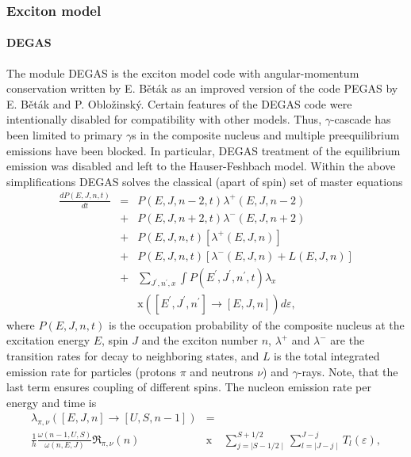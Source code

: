 \documentclass[twocolumn,amsmath,amssymb,10pt,groupedaddress,a4paper]{revtex4}
\begin{document}
\subsubsection{Exciton model \label{DEGAS}}

\paragraph{DEGAS}
The module DEGAS is the exciton model
code with angular-momentum conservation written by E. B\v et\' ak
as an improved version of the code PEGAS \cite{Degas} by E. B\v et\' ak
and P. Oblo\v zinsk\' y.  Certain features of the DEGAS code
were intentionally disabled for compatibility with other models.
Thus, $\gamma$-cascade has been limited to primary
$\gamma$s in the composite nucleus and multiple preequilibrium emissions
have been blocked. In particular, DEGAS treatment of the equilibrium
emission was disabled and left to the Hauser-Feshbach
model.
Within the above simplifications DEGAS solves the classical
(apart of spin) set of master equations
\begin{eqnarray}
\frac{dP(E,J,n,t)}{dt} & = & P(E,J,n-2,t)\lambda^{+}(E,J,n-2)\nonumber \\
 & + & P(E,J,n+2,t)\lambda^{-}(E,J,n+2)\nonumber \\
 & + & P(E,J,n,t)\left[\lambda^{+}(E,J,n)\right]\nonumber\\
 & + & P(E,J,n,t)\left[\lambda^{-}(E,J,n)+L(E,J,n)\right]\label{mastereq}\nonumber\\
 & + & \sum_{J^{'},n^{'},x}\int P(E^{'},J^{'},n^{'},t)\lambda_{x}\nonumber\\
 &&\text{x} \left(\left[E^{'},J^{'},n^{'}\right]\rightarrow\left[E,J,n\right]\right)d\varepsilon,
\end{eqnarray}
\noindent where $P(E,J,n,t)$ is the occupation probability of the composite
nucleus at the excitation energy $E$, spin $J$ and the exciton number
$n$, $\lambda^{+}$ and $\lambda^{-}$ are the transition rates for
decay to neighboring states, and $L$ is the total integrated emission
rate for particles (protons $\pi$ and neutrons $\nu$) and $\gamma$-rays.
Note, that the last term ensures coupling of different spins. The
nucleon emission rate per energy and time is
\begin{eqnarray}
\lambda_{\pi,\nu}\left(\left[E,J,n\right]\rightarrow\left[U,S,n-1\right]\right)&=&\\
\frac{1}{h}\frac{\omega(n-1,U,S)}{\omega(n,E,J)}\Re_{\pi,\nu}(n)&\text{x}& \sum_{j=\mid S-1/2\mid}^{S+1/2}\sum_{l=\mid J-j\mid}^{J-j}T_{l}(\varepsilon),\nonumber
\end{eqnarray}
\end{document}
